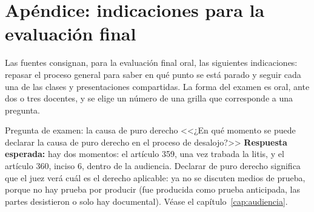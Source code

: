 \documentclass[12pt,oneside]{book}
\begin{document}
\chapter{Apéndice: indicaciones para la evaluación final}

Las fuentes consignan, para la evaluación final oral, las siguientes indicaciones: repasar el proceso general para saber en qué punto se está parado y seguir cada una de las clases y presentaciones compartidas. La forma del examen es oral, ante dos o tres docentes, y se elige un número de una grilla que corresponde a una pregunta.

\begin{example}{Pregunta de examen: la causa de puro derecho}
<<¿En qué momento se puede declarar la causa de puro derecho en el proceso de desalojo?>> \textbf{Respuesta esperada:} hay dos momentos: el artículo 359, una vez trabada la litis, y el artículo 360, inciso 6, dentro de la audiencia. Declarar de puro derecho significa que el juez verá cuál es el derecho aplicable: ya no se discuten medios de prueba, porque no hay prueba por producir (fue producida como prueba anticipada, las partes desistieron o solo hay documental). Véase el capítulo~\ref{cap:audiencia}.
\end{example}
\end{document}
